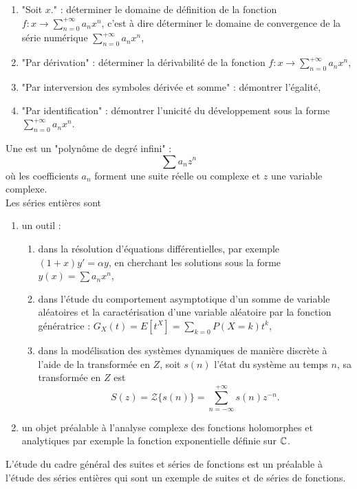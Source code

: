 \documentclass{book}
\begin{document}
\begin{Exemple}
\begin{enumerate}
\item "Soit $x$." : déterminer le domaine de définition de la fonction $f:x\to \sum_{n=0}^{+\infty}a_n x^n$, c'est à dire déterminer le domaine de convergence de la série numérique $\sum_{n=0}^{+\infty}a_n x^n$,
\item "Par dérivation"  : déterminer la dérivabilité de la fonction $f:x\to \sum_{n=0}^{+\infty}a_n x^n$, 
\item "Par interversion des symboles dérivée et somme" : démontrer l'égalité,
\item "Par identification" : démontrer l'unicité du développement sous la forme $\sum_{n=0}^{+\infty}a_n x^n$. 
\end{enumerate}
\end{Exemple}
Une  est un "polynôme de degré infini" :
$$\sum a_{n}z^{n}$$
où les coefficients $a_n$ forment une suite réelle ou complexe et $z$ une variable complexe.\\

Les séries entières sont 
\begin{enumerate}
\item un outil :
\begin{enumerate}
\item dans la résolution d'équations différentielles, par exemple $(1 + x)y' = \alpha y$, en cherchant les solutions sous la forme $y(x)=\sum a_{n}x^{n}$,    
\item dans l'étude du comportement asymptotique d'un somme de variable aléatoires et la caractérisation d'une variable aléatoire par la fonction génératrice : $G_X(t)=E[t^X]=\sum_{k=0}P (X=k)t^{k}$,
\item dans la modélisation des systèmes dynamiques de manière discrète à l'aide de la transformée en $Z$, soit $s(n)$ l'état du système au temps $n$, sa transformée en $Z$ est
$$ S(z) = \mathcal{Z}\{s(n)\} =\sum_{n=-\infty}^{+\infty}s(n)z^{-n}.$$
\end{enumerate}
\item un objet préalable à l'analyse complexe des fonctions holomorphes et analytiques par exemple la fonction exponentielle définie sur $\mathbb{C}$.
\end{enumerate}
L'étude  du cadre général des suites et séries de fonctions est un préalable à l'étude des séries entières qui sont un exemple de suites et de séries  de fonctions.
%
%
\end{document}
